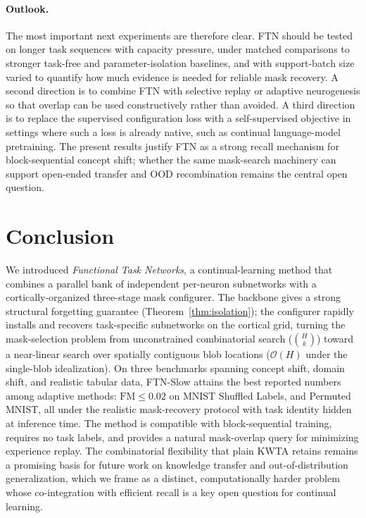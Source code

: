 \documentclass{article}
\begin{document}
\paragraph{Outlook.}
The most important next experiments are therefore clear. FTN should be tested on longer task sequences with capacity pressure, under matched comparisons to stronger task-free and parameter-isolation baselines, and with support-batch size varied to quantify how much evidence is needed for reliable mask recovery. A second direction is to combine FTN with selective replay or adaptive neurogenesis so that overlap can be used constructively rather than avoided. A third direction is to replace the supervised configuration loss with a self-supervised objective in settings where such a loss is already native, such as continual language-model pretraining. The present results justify FTN as a strong recall mechanism for block-sequential concept shift; whether the same mask-search machinery can support open-ended transfer and OOD recombination remains the central open question.

\section{Conclusion}

We introduced \emph{Functional Task Networks}, a continual-learning method that combines a parallel bank of independent per-neuron subnetworks with a cortically-organized three-stage mask configurer. The backbone gives a strong structural forgetting guarantee (Theorem~\ref{thm:isolation}); the configurer rapidly installs and recovers task-specific subnetworks on the cortical grid, turning the mask-selection problem from unconstrained combinatorial search ($\binom{H}{k}$) toward a near-linear search over spatially contiguous blob locations ($\mathcal{O}(H)$ under the single-blob idealization). On three benchmarks spanning concept shift, domain shift, and realistic tabular data, FTN-Slow attains the best reported numbers among adaptive methods: $\mathrm{FM}\le 0.02$ on MNIST Shuffled Labels, and Permuted MNIST, all under the realistic mask-recovery protocol with task identity hidden at inference time. The method is compatible with block-sequential training, requires no task labels, and provides a natural mask-overlap query for minimizing experience replay. The combinatorial flexibility that plain KWTA retains remains a promising basis for future work on knowledge transfer and out-of-distribution generalization, which we frame as a distinct, computationally harder problem whose co-integration with efficient recall is a key open question for continual learning.
\end{document}
